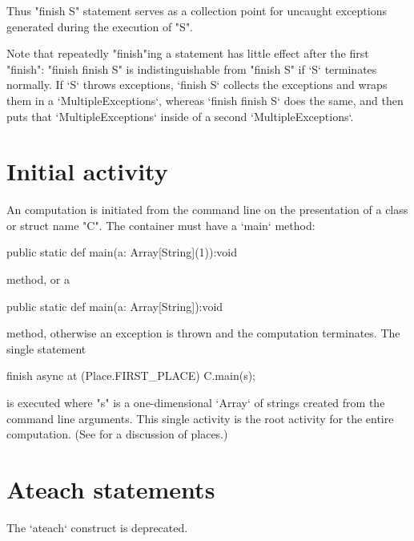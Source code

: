 Thus \xcd"finish S" statement serves as a collection point for
uncaught exceptions generated during the execution of \xcd"S".

Note that repeatedly \xcd"finish"ing a statement has little effect after
the first \xcd"finish": \xcd"finish finish S" is indistinguishable
from \xcd"finish S" if \xcd`S` terminates normally.  If \xcd`S` throws
exceptions, \xcd`finish S` collects the exceptions and wraps them in a 
\xcd`MultipleExceptions`, whereas \xcd`finish finish S` does the same, and
then puts that \xcd`MultipleExceptions` inside of a second
\xcd`MultipleExceptions`. 


\section{Initial activity}\label{initial-computation}

An \Xten{} computation is initiated from the command line on the
presentation of a class or struct name \xcd"C". The container must have a 
\xcd`main` method: 
\begin{xtenmath}
public static def main(a: Array[String](1)):void
\end{xtenmath}
method, 
or a 
\begin{xtenmath}
public static def main(a: Array[String]):void
\end{xtenmath}
method, 
otherwise an exception is thrown
and the computation terminates.  The single statement
\begin{xten}
finish async at (Place.FIRST_PLACE) {
  C.main(s);
}
\end{xten} 
\noindent is executed where \xcd"s" is a one-dimensional \xcd`Array` of
strings created 
from the command line arguments. This single activity is the root activity
for the entire computation. (See  for a discussion of
places.)


\section{Ateach statements}\label{ateach-section}
\deprecated{} The \xcd`ateach` construct is deprecated.

